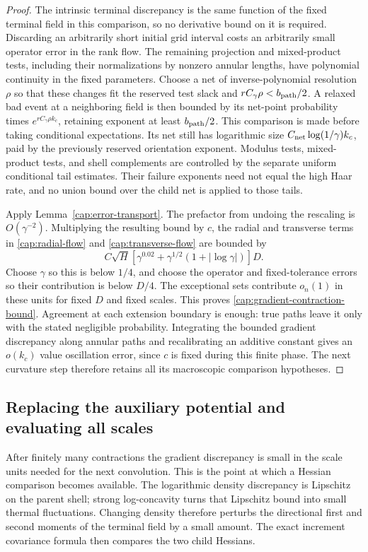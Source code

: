 \begin{proof}
The intrinsic terminal discrepancy is the same function of the fixed
terminal field in this comparison, so no derivative bound on it is
required. Discarding an arbitrarily short initial grid interval costs an
arbitrarily small operator error in the rank flow. The remaining
projection and mixed-product tests, including their normalizations by
nonzero annular lengths, have polynomial continuity in the fixed
parameters. Choose a net of inverse-polynomial resolution $\rho$ so
that these changes fit the reserved test slack and
$rC_\gamma\rho<b_{\rm path}/2$. A relaxed bad event at a neighboring
field is then bounded by its net-point probability times
$e^{rC_\gamma\rho k_c}$, retaining exponent at least
$b_{\rm path}/2$. This comparison is made before taking conditional
expectations. Its net still has logarithmic size
$C_{\rm net}\log(1/\gamma)k_c$, paid by the previously reserved
orientation exponent. Modulus tests,
mixed-product tests, and shell complements are controlled by the separate
uniform conditional tail estimates. Their failure exponents need not equal the
high Haar rate, and no union bound over the child net is applied to those
tails.

Apply Lemma~\ref{cap:error-transport}. The prefactor from undoing the
rescaling is $O(\gamma^{-2})$. Multiplying the resulting bound by $c$, the
radial and transverse terms in \eqref{cap:radial-flow} and
\eqref{cap:transverse-flow} are bounded by
\[
 C\sqrt H\left[\gamma^{0.02}
           +\gamma^{1/2}(1+|\log\gamma|)\right]D.
\]
Choose $\gamma$ so this is below $1/4$, and choose the operator and
fixed-tolerance errors so their contribution is below $D/4$. The exceptional
sets contribute $o_n(1)$ in these units for fixed $D$ and fixed scales. This
proves \eqref{cap:gradient-contraction-bound}. Agreement at each extension
boundary is enough: true paths leave it only with the stated negligible
probability. Integrating the bounded gradient discrepancy along annular paths
and recalibrating an additive constant gives an $o(k_c)$ value oscillation
error, since $c$ is fixed during this finite phase. The next curvature step
therefore retains all its macroscopic comparison hypotheses. \end{proof}

\subsection{Replacing the auxiliary potential and evaluating all scales}

After finitely many contractions the gradient discrepancy is small in the
scale units needed for the next convolution. This is the point at which a
Hessian comparison becomes available. The logarithmic density discrepancy is
Lipschitz on the parent shell; strong log-concavity turns that Lipschitz bound
into small thermal fluctuations. Changing density therefore perturbs the
directional first and second moments of the terminal field by a small amount.
The exact increment covariance formula then compares the two child Hessians.

